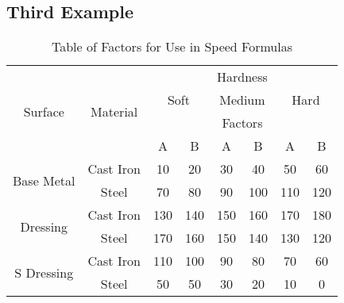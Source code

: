 \documentclass{article}
\begin{document}
\subsection{Third Example}
\begin{table}[p]
	\centering
	\begin{tabular}{|c|c|c|c|c|c|c|c|}
		\hline
		\multirow{4}{*}{Surface} & \multirow{4}{*}{Material} & \multicolumn{6}{c|}{Hardness}           \\
		\cline{3-8}
		&                    & \multicolumn{2}{c|}{Soft} & \multicolumn{2}{c|}{Medium} & \multicolumn{2}{c|}{Hard} \\
		\cline{3-8}
		&                    & \multicolumn{6}{c|}{Factors}                                               \\
		\cline{3-8}
		&                           &  A  &   B     &  A   &   B   &   A    &  B     \\
		\hline
		\multirow{2}{*}{Base Metal} &    Cast Iron    &  10 &   20    & 30   & 40    &  50    &  60      \\
		\cline{2-8}
		&  Steel           &  70 &   80    & 90   & 100   &  110   &  120     \\
		\hline
		\multirow{2}{*}{Dressing} &        Cast Iron  & 130 &  140    & 150  &  160  &  170   &  180     \\
		\cline{2-8}
		&          Steel            &  170&  160    & 150  &  140  &  130   &  120     \\
		\hline
		\multirow{2}{*}{S Dressing} &    Cast Iron    &  110&   100   & 90   & 80    &  70    &  60      \\
		\cline{2-8}
		&      Steel                &  50 &  50     & 30   & 20    & 10     &0\\
		\hline
	\end{tabular}
	\caption{Table of Factors for Use in Speed Formulas}
\end{table}
\end{document}
